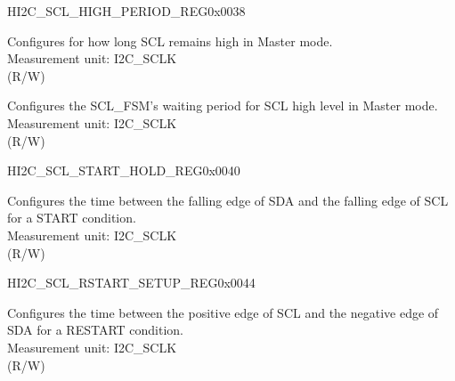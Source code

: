 \begin{register}{H}{I2C\_SCL\_HIGH\_PERIOD\_REG}{0x0038}\label{regdesc:I2CSCLHIGHPERIODREG}
%
%
%
\regnewline%
\begin{regdesc}\begin{reglist}
\label{fielddesc:I2CSCLHIGHPERIOD}\item [I2C\_SCL\_HIGH\_PERIOD] Configures for how long SCL remains high in Master mode.\\
Measurement unit: I2C\_SCLK \\ (R/W)
\label{fielddesc:I2CSCLWAITHIGHPERIOD}\item [I2C\_SCL\_WAIT\_HIGH\_PERIOD] Configures the SCL\_FSM's waiting period for SCL high level in Master mode.\\
Measurement unit: I2C\_SCLK \\ (R/W)
\end{reglist}\end{regdesc}
\end{register}


\begin{register}{H}{I2C\_SCL\_START\_HOLD\_REG}{0x0040}\label{regdesc:I2CSCLSTARTHOLDREG}
%
%
\regnewline%
\begin{regdesc}\begin{reglist}
\label{fielddesc:I2CSCLSTARTHOLDTIME}\item [I2C\_SCL\_START\_HOLD\_TIME] Configures the time between the falling edge of SDA and the falling edge of SCL for a START condition.\\
Measurement unit: I2C\_SCLK \\ (R/W)
\end{reglist}\end{regdesc}
\end{register}


\begin{register}{H}{I2C\_SCL\_RSTART\_SETUP\_REG}{0x0044}\label{regdesc:I2CSCLRSTARTSETUPREG}
%
%
\regnewline%
\begin{regdesc}\begin{reglist}
\label{fielddesc:I2CSCLRSTARTSETUPTIME}\item [I2C\_SCL\_RSTART\_SETUP\_TIME] Configures the time between the positive edge of SCL and the negative edge of SDA for a RESTART condition.\\
Measurement unit: I2C\_SCLK \\ (R/W)
\end{reglist}\end{regdesc}
\end{register}


